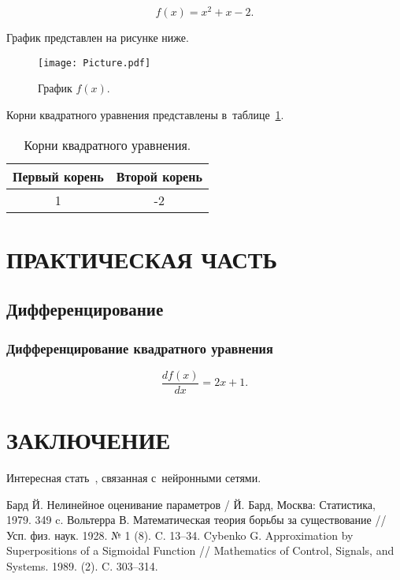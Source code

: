 \documentclass[rusmathsym, eqnumwithinsec, amspack, hyperref]{bomgost}
\begin{document}
\begin{equation}
f(x) = x^2 + x-2.
\end{equation}

График представлен на рисунке ниже.
\begin{gostfigure}
\begin{figure}[H]
\centering
\texttt{[image: Picture.pdf]}
\caption{График \(f(x)\).}
\end{figure}
\end{gostfigure}

Корни квадратного уравнения представлены в~таблице~\ref{tab:roots}.
\begin{gosttable}
\begin{table}[H]
\centering
\caption{Корни квадратного уравнения.}
\label{tab:roots}
\begin{tabular}{|c|c|}
\hline 
Первый корень &  Второй корень \\ 
\hline 
1 & -2  \\ 
\hline 
\end{tabular}
\end{table}
\end{gosttable}



\section{ПРАКТИЧЕСКАЯ ЧАСТЬ}
\subsection{Дифференцирование}
\subsubsection{Дифференцирование квадратного уравнения}
\begin{equation}
\dfrac{d f(x)}{d x} = 2 x + 1.
\end{equation}

\section*{ЗАКЛЮЧЕНИЕ}
Интересная стать~\cite{Cybenko}, связанная с~нейронными сетями.

\begin{thebibliography}{11}
 Бард Й. Нелинейное оценивание параметров / Й. Бард, Москва: Статистика, 1979. 349 c.
 Вольтерра В. Математическая теория борьбы за существование // Усп. физ. наук. 1928. № 1 (8). C. 13–34.
 Cybenko G. Approximation by Superpositions of a Sigmoidal Function // Mathematics of Control, Signals, and Systems. 1989. (2). C. 303–314.
\end{thebibliography}
\end{document}
